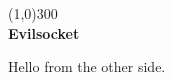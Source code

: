 \documentclass{article}
\begin{document}


\begin{titlepage}

    \begin{center}
        \line(1,0){300} \\ 
        \huge{\bfseries Evilsocket}
    \end{center}

\end{titlepage}

Hello from the other side.
\end{document}
